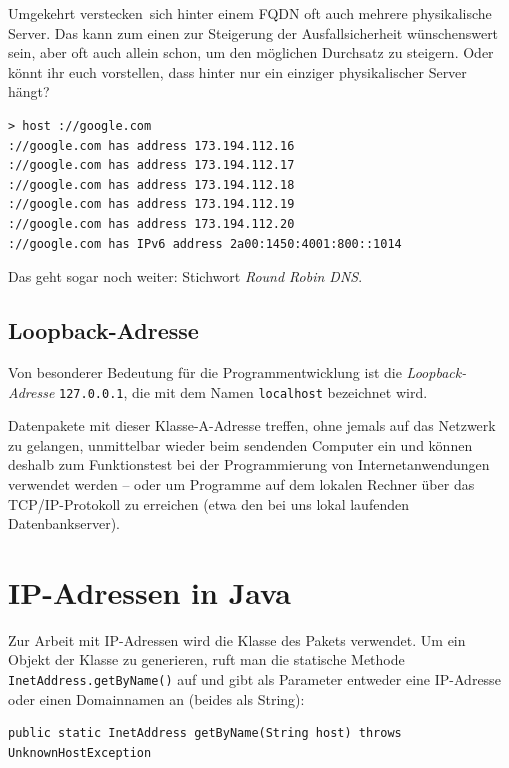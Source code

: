 Umgekehrt \glqq verstecken\grqq\ sich hinter einem FQDN oft auch mehrere physikalische
Server. Das kann zum einen zur Steigerung der Ausfallsicherheit wünschenswert
sein, aber oft auch allein schon, um den möglichen Durchsatz zu steigern. Oder
könnt ihr euch vorstellen, dass hinter  nur ein
einziger physikalischer Server hängt?

\begin{lstlisting}
> host ://google.com
://google.com has address 173.194.112.16
://google.com has address 173.194.112.17
://google.com has address 173.194.112.18
://google.com has address 173.194.112.19
://google.com has address 173.194.112.20
://google.com has IPv6 address 2a00:1450:4001:800::1014
\end{lstlisting}

Das geht sogar noch weiter: Stichwort \emph{Round Robin DNS}.


\subsection{Loopback-Adresse}

Von besonderer Bedeutung für die Programmentwicklung ist die
\emph{Loopback-Adresse} \lstinline|127.0.0.1|, die mit dem Namen
\lstinline|localhost| bezeichnet wird.

Datenpakete mit dieser Klasse-A-Adresse treffen, ohne jemals auf das Netzwerk
zu gelangen, unmittelbar wieder beim sendenden Computer ein und können deshalb
zum Funktionstest bei der Programmierung von Internetanwendungen verwendet
werden -- oder um Programme auf dem lokalen Rechner über das TCP/IP-Protokoll zu
erreichen (etwa den bei uns lokal laufenden Datenbankserver).


\section{IP-Adressen in Java}

Zur Arbeit mit IP-Adressen wird die Klasse  des Pakets
 verwendet. Um ein Objekt der Klasse 
zu generieren, ruft man die statische Methode
\lstinline|InetAddress.getByName()| auf und gibt als Parameter entweder eine
IP-Adresse oder einen Domainnamen an (beides als String):

\begin{lstlisting}
public static InetAddress getByName(String host) throws UnknownHostException
\end{lstlisting}

